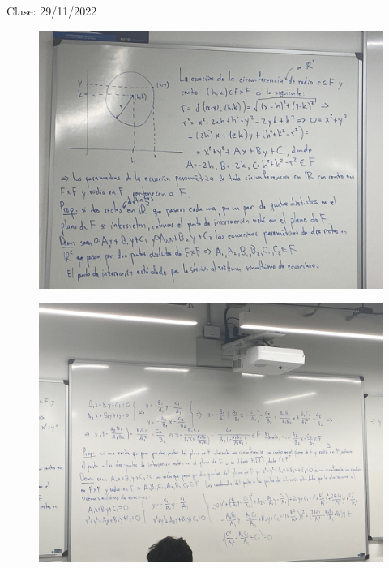 Clase: 29/11/2022

\begin{figure}[H]
    \centering
    \includegraphics[scale=0.2]{imagenes/28.1.jpeg}
\end{figure}
\begin{figure}[H]
    \centering
    \includegraphics[scale=0.2]{imagenes/28.2.jpeg}
\end{figure}


